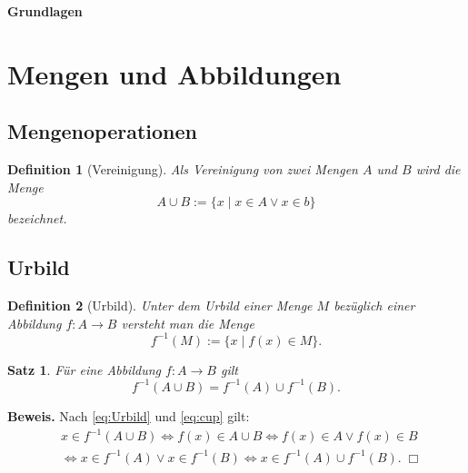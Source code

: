 \documentclass[a4paper,fleqn,10pt]{scrartcl}
\newcommand{\strong}[1]{\textsf{\textbf{#1}}}
\theoremstyle{rmbox}
\newtheorem{definition}{Definition}
\newtheorem{theorem}{Satz}
\begin{document}
\thispagestyle{empty}

\noindent
{\huge\bfseries Grundlagen}

\tableofcontents

\section{Mengen und Abbildungen}

\subsection{Mengenoperationen}

\begin{definition}[Vereinigung]
Als \emph{Vereinigung} von zwei Mengen $A$ und $B$ wird die Menge
\begin{equation}\label{eq:cup}
A\cup B := \{x\mid x\in A\lor x\in b\}
\end{equation}
bezeichnet.
\end{definition}


\subsection{Urbild}

\begin{definition}[Urbild]
Unter dem \emph{Urbild} einer Menge $M$ bezüglich einer
Abbildung $f\colon A\to B$ versteht
man die Menge
\begin{equation}\label{eq:Urbild}
f^{-1}(M) := \{x\mid f(x)\in M\}.
\end{equation}
\end{definition}

\begin{theorem}
Für eine Abbildung $f\colon A\to B$ gilt
\begin{equation}
f^{-1}(A\cup B) = f^{-1}(A)\cup f^{-1}(B).
\end{equation}
\end{theorem}

\noindent
\strong{Beweis.} Nach \eqref{eq:Urbild} und \eqref{eq:cup} gilt:
\begin{align}
&x\in f^{-1}(A\cup B)\iff f(x)\in A\cup B
\iff f(x)\in A\lor f(x)\in B\\
&\iff x\in f^{-1}(A)\lor x\in f^{-1}(B)
\iff x\in f^{-1}(A)\cup f^{-1}(B).\;\Box
\end{align}
\end{document}
